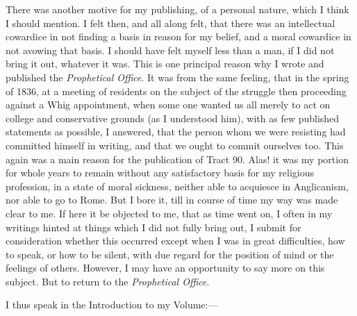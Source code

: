 There was another motive for my publishing, of a personal
nature, which I think I should mention. I felt then, and all along felt,
that there was an intellectual cowardice in not finding a basis
in reason for my belief, and a moral cowardice in not avowing that
basis. I should have felt myself less than a man, if I did not bring it
out, whatever it was. This is one principal reason why I wrote and
published the \emph{Prophetical Office}. It was from the
same feeling, that in the spring of 1836, at a meeting of residents on
the subject of the struggle then proceeding against a Whig
appointment, when some one wanted us all merely to act on
college and conservative grounds (as I understood him), with as few
published statements as possible, I answered, that the person
whom we were resisting had committed himself in writing, and that we
ought to commit ourselves too. This again was a main reason for the
publication of Tract 90. Alas! it was my portion for whole years to
remain without any satisfactory basis for my religious profession, in a
state of moral sickness, neither able to acquiesce in Anglicanism, nor
able to go to Rome. But I bore it, till in course of time my way was
made clear to me. If here it be objected to me, that as time went on, I
often in my writings hinted at things which I did not fully bring out, I
submit for consideration whether this occurred except when I was in
great difficulties, how to speak, or how to be silent, with due regard
for the position of mind or the feelings of others. However, I may have
an opportunity to say more on this subject. But to return to the \emph{Prophetical
Office}.

I thus speak in the Introduction to my Volume:—

